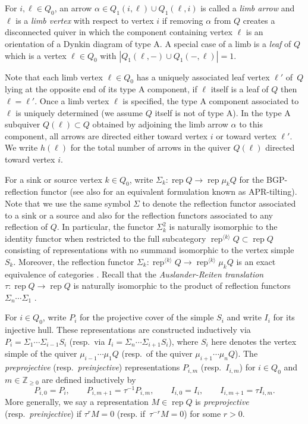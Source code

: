 \documentclass{amsart}
\newtheorem{lemma}[theorem]{Lemma}
\numberwithin{equation}{section}
\newcommand{\ZZ}{\mathbb{Z}}
\newcommand{\Hom}{\operatorname{Hom}}
\newcommand{\Irr}{\operatorname{Irr}}
\newcommand{\rep}{\operatorname{rep}}
\begin{document}
For $i,\ell\in Q_0$, an arrow $\alpha\in Q_1(i,\ell)\cup Q_1(\ell,i)$ is called a \emph{limb arrow} and $\ell$ is a \emph{limb vertex} with respect to vertex $i$ if removing $\alpha$ from $Q$ creates a disconnected quiver in which the component containing vertex $\ell$ is an orientation of a Dynkin diagram of type A.
A special case of a limb is a \emph{leaf} of $Q$ which is a vertex $\ell\in Q_0$ with $|Q_1(\ell,-)\cup Q_1(-,\ell)|=1$.

Note that each limb vertex $\ell\in Q_0$ has a uniquely associated leaf vertex $\ell'$ of~$Q$ lying at the opposite end of its type A component, if $\ell$ itself is a leaf of $Q$ then $\ell=\ell'$.
Once a limb vertex $\ell$ is specified, the type A component associated to $\ell$ is uniquely determined (we assume $Q$ itself is not of type A).
In the type A subquiver $Q(\ell)\subset Q$ obtained by adjoining the limb arrow $\alpha$ to this component, all arrows are directed either toward vertex $i$ or toward vertex $\ell'$.
We write $h(\ell)$ for the total number of arrows in the quiver $Q(\ell)$ directed toward vertex $i$.

For a sink or source vertex $k\in Q_0$, write $\Sigma_k:\rep Q\to\rep \mu_k Q$ for the BGP-reflection functor \cite{BGP??} (see also \cite{APR??} for an equivalent formulation known as APR-tilting).
Note that we use the same symbol $\Sigma$ to denote the reflection functor associated to a sink or a source and also for the reflection functors associated to any reflection of $Q$.
In particular, the functor $\Sigma_k^2$ is naturally isomorphic to the identity functor when restricted to the full subcategory $\rep^{\langle k\rangle} Q\subset\rep Q$ consisting of representations with no summand isomorphic to the vertex simple $S_k$.
Moreover, the reflection functor $\Sigma_k:\rep^{\langle k\rangle} Q\to\rep^{\langle k\rangle} \mu_k Q$ is an exact equivalence of categories \cite{DR76}.
Recall that the \emph{Auslander-Reiten translation} $\tau:\rep Q\to\rep Q$ is naturally isomorphic to the product of reflection functors $\Sigma_n\cdots\Sigma_1$ \cite{BB??}.

For $i\in Q_0$, write $P_i$ for the projective cover of the simple $S_i$ and write $I_i$ for its injective hull.
These representations are constructed inductively via $P_i=\Sigma_1\cdots\Sigma_{i-1}S_i$ (resp.~via $I_i=\Sigma_n\cdots\Sigma_{i+1}S_i$), where $S_i$ here denotes the vertex simple of the quiver $\mu_{i-1}\cdots\mu_1 Q$ (resp.~of the quiver $\mu_{i+1}\cdots\mu_n Q$).
The \emph{preprojective} (resp.~\emph{preinjective}) representations $P_{i,m}$ (resp.~$I_{i,m}$) for $i\in Q_0$ and $m\in\ZZ_{\ge0}$ are defined inductively by
\[P_{i,0}=P_i,\qquad P_{i,m+1}=\tau^{-1} P_{i,m},\qquad I_{i,0}=I_i,\qquad I_{i,m+1}=\tau I_{i,m}.\]
More generally, we say a representation $M\in\rep Q$ is \emph{preprojective} (resp.~\emph{preinjective}) if $\tau^r M=0$ (resp. if~$\tau^{-r} M=0$) for some $r>0$.
\end{document}
